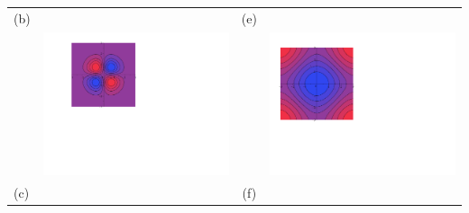 \documentclass[12pt]{article}
\begin{document}
\begin{enumerate}
\begin{center}
\begin{tabular}{lc|cc}
(b)&&(e)\\
&\includegraphics[scale=0.56]{matching2.pdf} && \includegraphics[scale=0.48]{matching5.pdf}\\
(c)&&(f)\\

\end{tabular}
\end{center}
\end{enumerate}
\end{document}

